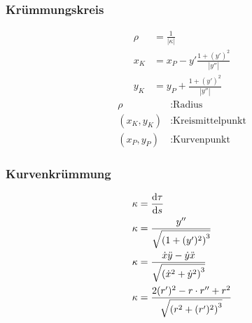 \newpage
\subsubsection*{Krümmungskreis}
\begin{multicols}{2}
\vfill{
\begin{align*} 
\rho&=\frac{1}{|\kappa|}\\
x_K&=x_P-y'\frac{1+(y')^2}{|y''|}\\
y_K&=y_P+\frac{1+(y')^2}{|y''|}
\end{align*}}
\vfill
\begin{align*}
\rho&: \text{Radius}\\
\left(x_K, y_K \right)&: \text{Kreismittelpunkt} \\
\left( x_P, y_P \right)&: \text{Kurvenpunkt}
\end{align*}
\vfill
\end{multicols}

\subsubsection*{Kurvenkrümmung}
\begin{align*} 
\kappa&=\frac{\mathop{}\!\mathrm{d} \tau}{\mathop{}\!\mathrm{d} s}\\
\kappa&=\frac{y''}{\sqrt{\left(1+(y')^2\right)^3}}\\
\kappa&=\frac{\dot{x}\ddot{y}-\dot{y}\ddot{x}}{\sqrt{\left(\dot{x}^2+\dot{y}^2\right)^3}}\\
\kappa&=\frac{2(r')^2-r\cdot r''+r^2}{\sqrt{\left(r^2+(r')^2\right)^3}}
\end{align*}